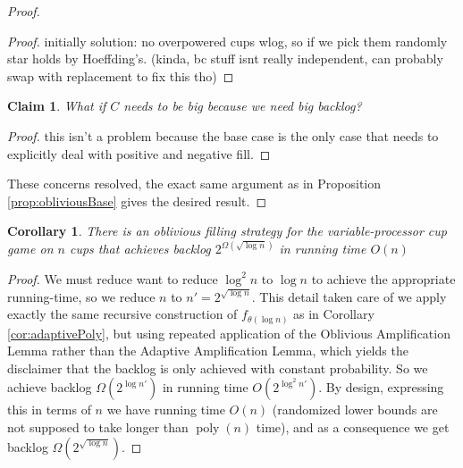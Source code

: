 \documentclass[twocolumn]{article}[11pt]
\DeclareMathOperator{\poly}{\text{poly}}
\newtheorem{clm}{Claim}
\newtheorem{corollary}{Corollary}
\begin{document}
\begin{proof}
\begin{proof}
    initially solution: no overpowered cups wlog, so if we pick them randomly star holds
    by Hoeffding's. (kinda, bc stuff isnt really independent, can probably swap
    with replacement to fix this tho)
  
\end{proof}
\begin{clm}
  What if $C$ needs to be big because we need big backlog? 
\end{clm}
\begin{proof}
 this isn't a problem because the base case is the only case that needs to
 explicitly deal with positive and negative fill.
\end{proof}
These concerns resolved, the exact same argument as in Proposition
\ref{prop:obliviousBase} gives the desired result.

\end{proof}

\begin{corollary}
  There is an oblivious filling strategy for the variable-processor cup game on
  $n$ cups that achieves backlog $2^{\Omega(\sqrt{\log n})}$ in running time
  $O(n)$
\end{corollary}
\begin{proof}
  We must reduce want to reduce $\log^2 n$ to $\log n$ to achieve the
  appropriate running-time, so we reduce $n$ to $n' = 2^{\sqrt{\log n}}$. This
  detail taken care of we apply exactly the same recursive construction of
  $f_{\theta(\log n)}$ as in Corollary \ref{cor:adaptivePoly}, but using
  repeated application of the Oblivious Amplification Lemma rather than the
  Adaptive Amplification Lemma, which yields the disclaimer that the backlog is
  only achieved with constant probability.
  So we achieve backlog $\Omega(2^{\log n'})$ in running time $O(2^{\log^2
  n'})$. By design, expressing this in terms of $n$ we have running time $O(n)$
  (randomized lower bounds are not supposed to take longer than $\poly(n)$
  time), and as a consequence we get backlog $\Omega(2^{\sqrt{\log n}})$.
\end{proof}




\end{document}
